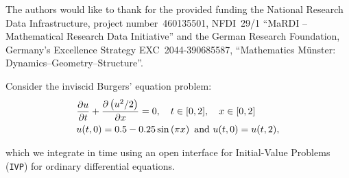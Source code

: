 \documentclass[a0paper, twocolumn, csc, english, final]{mpi2015_poster}
\begin{document}
\begin{poster}
\begin{pcolumn}
\begin{pbox}

    \end{pbox}

    \begin{pbox}
      \large
      The authors would like to thank for the provided funding
      the National Research Data Infrastructure,
      project number~460135501, NFDI~29/1 “MaRDI – Mathematical
      Research Data Initiative”
      and
      the German Research Foundation,
      Germany's Excellence Strategy EXC~2044-390685587,
      ``Mathematics Münster: Dynamics--Geometry--Structure''.
    \end{pbox}
  \end{pcolumn}
  \begin{pcolumn}
    \begin{pbox}
      \large
      Consider the inviscid Burgers' equation problem:
      \begin{align*}
         & \pdv{u}{t} + \pdv{\left( u^{2} / 2 \right)}{x} = 0,
        \quad t \in [0, 2], \quad x \in [0, 2]                 \\
         & u(t, 0) = 0.5 - 0.25 \sin \left( \pi x \right) \mbox{ and }
         u(t, 0) = u(t, 2),
      \end{align*}
      \begin{minipage}{\dimexpr0.58\columnwidth - 2\tabcolsep}
        which we integrate in time
        using an open interface
        for Initial-Value Problems (\texttt{IVP}) for ordinary
        differential equations.


\end{minipage}
\end{pbox}
\end{pcolumn}
\end{poster}
\end{document}
